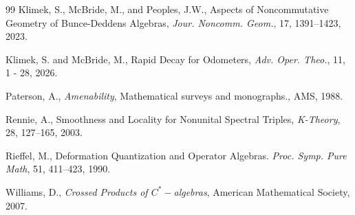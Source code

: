 \documentclass[12pt,reqno]{amsart}
\numberwithin{equation}{section}
\begin{document}
\begin{thebibliography}{99}
Klimek, S., McBride, M., and Peoples, J.W., Aspects of Noncommutative Geometry of Bunce-Deddens Algebras,  {\it Jour. Noncomm. Geom.}, 17, 1391–1423, 2023.

Klimek, S. and McBride, M., Rapid Decay for Odometers, {\it Adv. Oper. Theo.}, 11, 1 - 28, 2026. 

Paterson, A., {\it Amenability}, Mathematical surveys and monographs., AMS, 1988.

Rennie, A., Smoothness and Locality for Nonunital Spectral Triples, {\it K-Theory}, 28, 127–165, 2003.

Rieﬀel, M., Deformation Quantization and Operator Algebras. \textit{Proc. Symp. Pure Math}, 51, 411–423, 1990.

Williams, D., {\it Crossed Products of $C^*-$algebras}, American Mathematical Society, 2007.


\end{thebibliography}
\end{document}
